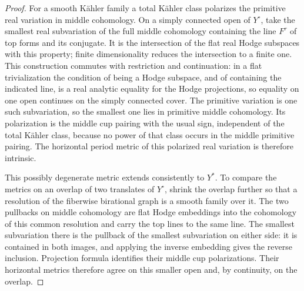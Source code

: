 \begin{proof}
For a smooth K\"ahler family a total K\"ahler class polarizes the primitive
real variation in middle cohomology.  On a simply connected open of
\(Y^\circ\), take the smallest real subvariation of the full middle
cohomology containing the line \(F^r\) of top forms and its conjugate.
It is the intersection of the flat real Hodge subspaces with this property;
finite dimensionality reduces the intersection to a finite one.  This
construction commutes with restriction and continuation: in a flat
trivialization the condition of being a Hodge subspace, and of containing
the indicated line, is a real analytic equality for the Hodge projections,
so equality on one open continues on the simply connected cover.  The
primitive variation is one such subvariation, so the smallest one lies in
primitive middle cohomology.  Its polarization is the middle cup pairing
with the usual sign, independent of the total K\"ahler class, because no
power of that class occurs in the middle primitive pairing.  The horizontal
period metric of this polarized real variation is therefore intrinsic.

This possibly degenerate metric extends consistently to \(Y^*\).
To compare the metrics on an overlap of two translates of \(Y^\circ\),
shrink the overlap further so that a resolution of the fiberwise birational
graph is a smooth family over it.  The two pullbacks on middle cohomology are
flat Hodge embeddings into the cohomology of this common resolution and
carry the top lines to the same line.  The smallest subvariation there is
the pullback of the smallest subvariation on either side: it is contained
in both images, and applying the inverse embedding gives the reverse
inclusion.  Projection formula identifies their middle cup polarizations.
Their horizontal metrics therefore agree on this smaller open and, by
continuity, on the overlap.


\end{proof}
